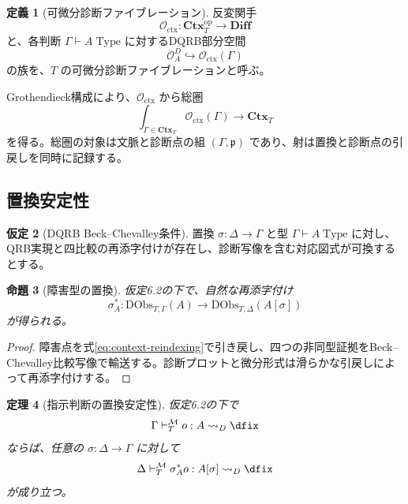 \documentclass[a4paper,11pt]{ltjsarticle}
\theoremstyle{definition}
\newtheorem{definition}{定義}[section]
\newtheorem{assumption}[definition]{仮定}
\theoremstyle{plain}
\newtheorem{proposition}[definition]{命題}
\newtheorem{theorem}[definition]{定理}
\newcommand{\Diff}{\mathbf{Diff}}
\newcommand{\Ctx}{\mathbf{Ctx}}
\newcommand{\DObs}{\mathrm{DObs}}
\newcommand{\Meta}{\mathcal M}
\newcommand{\Type}{\mathrm{Type}}
\begin{document}
\begin{definition}[可微分診断ファイブレーション]
反変関手
\begin{equation}
 \mathcal O_{\mathrm{ctx}}:\Ctx_T^{\mathrm{op}}\longrightarrow\Diff
 \label{eq:diagnostic-functor}
\end{equation}
と、各判断 $\Gamma\vdash A\;\Type$ に対するDQRB部分空間
\begin{equation}
 \mathcal O_A^D\hookrightarrow\mathcal O_{\mathrm{ctx}}(\Gamma)
 \end{equation}
の族を、$T$ の可微分診断ファイブレーションと呼ぶ。
\end{definition}

Grothendieck構成により、$\mathcal O_{\mathrm{ctx}}$ から総圏
\begin{equation}
 \int_{\Gamma\in\Ctx_T}\mathcal O_{\mathrm{ctx}}(\Gamma)
 \longrightarrow\Ctx_T
 \label{eq:grothendieck}
\end{equation}
を得る。総圏の対象は文脈と診断点の組 $(\Gamma,\mathfrak p)$ であり、射は置換と診断点の引戻しを同時に記録する。

\subsection{置換安定性}

\begin{assumption}[DQRB Beck--Chevalley条件]
置換 $\sigma:\Delta\to\Gamma$ と型 $\Gamma\vdash A\;\Type$ に対し、QRB実現と四比較の再添字付けが存在し、診断写像を含む対応図式が可換するとする。
\end{assumption}

\begin{proposition}[障害型の置換]
仮定6.2の下で、自然な再添字付け
\begin{equation}
 \sigma_A^*:\DObs_{T,\Gamma}(A)
 \longrightarrow
 \DObs_{T,\Delta}(A[\sigma])
 \label{eq:dobs-substitution}
\end{equation}
が得られる。
\end{proposition}

\begin{proof}
障害点を式\eqref{eq:context-reindexing}で引き戻し、四つの非同型証拠をBeck--Chevalley比較写像で輸送する。診断プロットと微分形式は滑らかな引戻しによって再添字付けする。
\end{proof}

\begin{theorem}[指示判断の置換安定性]
仮定6.2の下で
\begin{equation}
 \Gamma\vdash_T^{\Meta}o:A\rightsquigarrow_D\dfix
 \end{equation}
ならば、任意の $\sigma:\Delta\to\Gamma$ に対して
\begin{equation}
 \Delta\vdash_T^{\Meta}
 \sigma_A^*o:A[\sigma]\rightsquigarrow_D\dfix
 \end{equation}
が成り立つ。
\end{theorem}
\end{document}
